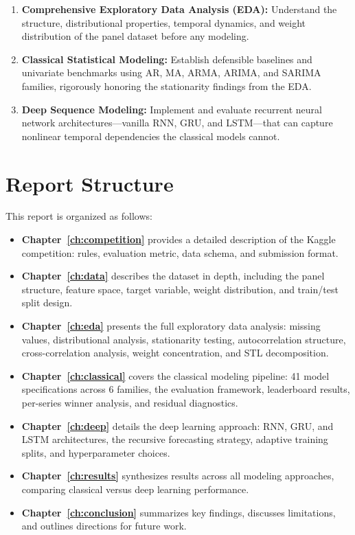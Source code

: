 \begin{enumerate}[label=(\roman*)]
    \item \textbf{Comprehensive Exploratory Data Analysis (EDA):} Understand the structure, distributional properties, temporal dynamics, and weight distribution of the panel dataset before any modeling.
    \item \textbf{Classical Statistical Modeling:} Establish defensible baselines and univariate benchmarks using AR, MA, ARMA, ARIMA, and SARIMA families, rigorously honoring the stationarity findings from the EDA.
    \item \textbf{Deep Sequence Modeling:} Implement and evaluate recurrent neural network architectures---vanilla RNN, GRU, and LSTM---that can capture nonlinear temporal dependencies the classical models cannot.
\end{enumerate}

\section{Report Structure}

This report is organized as follows:

\begin{itemize}
    \item \textbf{Chapter~\ref{ch:competition}} provides a detailed description of the Kaggle competition: rules, evaluation metric, data schema, and submission format.
    \item \textbf{Chapter~\ref{ch:data}} describes the dataset in depth, including the panel structure, feature space, target variable, weight distribution, and train/test split design.
    \item \textbf{Chapter~\ref{ch:eda}} presents the full exploratory data analysis: missing values, distributional analysis, stationarity testing, autocorrelation structure, cross-correlation analysis, weight concentration, and STL decomposition.
    \item \textbf{Chapter~\ref{ch:classical}} covers the classical modeling pipeline: 41 model specifications across 6 families, the evaluation framework, leaderboard results, per-series winner analysis, and residual diagnostics.
    \item \textbf{Chapter~\ref{ch:deep}} details the deep learning approach: RNN, GRU, and LSTM architectures, the recursive forecasting strategy, adaptive training splits, and hyperparameter choices.
    \item \textbf{Chapter~\ref{ch:results}} synthesizes results across all modeling approaches, comparing classical versus deep learning performance.
    \item \textbf{Chapter~\ref{ch:conclusion}} summarizes key findings, discusses limitations, and outlines directions for future work.
\end{itemize}

